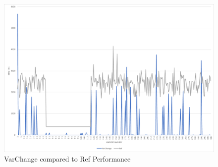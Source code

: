 \documentclass[a4paper]{article}
\begin{document}
\begin{figure}[h] 
  \centering
  \begin{minipage}[b]{1\textwidth} 
    \caption[VarChange Performance]{VarChange compared to Ref Performance}\label{fig:var-change}
    \centering
    \includegraphics[height=1\textwidth, angle=90]{img/var-change-vs-ref.pdf}
  \end{minipage}
\end{figure}
\end{document}
